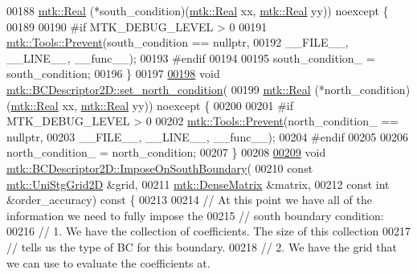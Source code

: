 \begin{DoxyCode}
00188     \hyperlink{group__c01-roots_gac080bbbf5cbb5502c9f00405f894857d}{mtk::Real} (*south\_condition)(\hyperlink{group__c01-roots_gac080bbbf5cbb5502c9f00405f894857d}{mtk::Real} xx, \hyperlink{group__c01-roots_gac080bbbf5cbb5502c9f00405f894857d}{mtk::Real} yy)) noexcept \{
00189 
00190 \textcolor{preprocessor}{  #if MTK\_DEBUG\_LEVEL > 0}
00191   \hyperlink{classmtk_1_1Tools_a332324c6f25e66be9dff48c5987a3b9f}{mtk::Tools::Prevent}(south\_condition == \textcolor{keyword}{nullptr},
00192                       \_\_FILE\_\_, \_\_LINE\_\_, \_\_func\_\_);
00193 \textcolor{preprocessor}{  #endif}
00194 
00195   south\_condition\_ = south\_condition;
00196 \}
00197 
\hypertarget{mtk__bc__descriptor__2d_8cc_source_l00198}{}\hyperlink{classmtk_1_1BCDescriptor2D_a690f6881a88b202c074d9f90f2a7ddb0}{00198} \textcolor{keywordtype}{void} \hyperlink{classmtk_1_1BCDescriptor2D_a690f6881a88b202c074d9f90f2a7ddb0}{mtk::BCDescriptor2D::set\_north\_condition}(
00199     \hyperlink{group__c01-roots_gac080bbbf5cbb5502c9f00405f894857d}{mtk::Real} (*north\_condition)(\hyperlink{group__c01-roots_gac080bbbf5cbb5502c9f00405f894857d}{mtk::Real} xx, \hyperlink{group__c01-roots_gac080bbbf5cbb5502c9f00405f894857d}{mtk::Real} yy)) noexcept \{
00200 
00201 \textcolor{preprocessor}{  #if MTK\_DEBUG\_LEVEL > 0}
00202   \hyperlink{classmtk_1_1Tools_a332324c6f25e66be9dff48c5987a3b9f}{mtk::Tools::Prevent}(north\_condition\_ == \textcolor{keyword}{nullptr},
00203                       \_\_FILE\_\_, \_\_LINE\_\_, \_\_func\_\_);
00204 \textcolor{preprocessor}{  #endif}
00205 
00206   north\_condition\_ = north\_condition;
00207 \}
00208 
\hypertarget{mtk__bc__descriptor__2d_8cc_source_l00209}{}\hyperlink{classmtk_1_1BCDescriptor2D_acba15639218e80fd93aff482b185201e}{00209} \textcolor{keywordtype}{void} \hyperlink{classmtk_1_1BCDescriptor2D_acba15639218e80fd93aff482b185201e}{mtk::BCDescriptor2D::ImposeOnSouthBoundary}(
00210     \textcolor{keyword}{const} \hyperlink{classmtk_1_1UniStgGrid2D}{mtk::UniStgGrid2D} &grid,
00211     \hyperlink{classmtk_1_1DenseMatrix}{mtk::DenseMatrix} &matrix,
00212     \textcolor{keyword}{const} \textcolor{keywordtype}{int} &order\_accuracy)\textcolor{keyword}{ const }\{
00213 
00214   \textcolor{comment}{// At this point we have all of the information we need to fully impose the}
00215   \textcolor{comment}{// south boundary condition:}
00216   \textcolor{comment}{// 1. We have the collection of coefficients. The size of this collection}
00217   \textcolor{comment}{// tells us the type of BC for this boundary.}
00218   \textcolor{comment}{// 2. We have the grid that we can use to evaluate the coefficients at.}

\end{DoxyCode}

